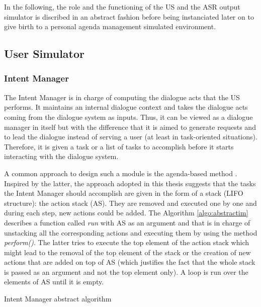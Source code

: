                                 In the following, the role and the functioning of the US and the ASR output simulator is discribed in an abstract fashion before being instanciated later on to give birth to a personal agenda management simulated environment.
    
	\subsection{User Simulator}

			\subsubsection{Intent Manager}
			\label{subsec:intentmanager}

					The Intent Manager is in charge of computing the dialogue acts that the US performs. It maintains an internal dialogue context and takes the dialogue acts coming from the dialogue system as inputs. Thus, it can be viewed as a dialogue manager in itself but with the difference that it is aimed to generate requests and to lead the dialogue instead of serving a user (at least in task-oriented situations). Therefore, it is given a task or a list of tasks to accomplish before it starts interacting with the dialogue system.

					A common approach to design such a module is the agenda-based method \cite{Wei1999,Schatzmann2007}. Inspired by the latter, the approach adopted in this thesis suggests that the tasks the Intent Manager should accomplish are given in the form of a stack (LIFO structure): the action stack (AS). They are removed and executed one by one and during each step, new actions could be added. The Algorithm \ref{algo:abstractim} describes a function called \textit{run} with AS as an argument and that is in charge of unstacking all the corresponding actions and executing them by using the method \textit{perform()}. The latter tries to execute the top element of the action stack which might lead to the removal of the top element of the stack or the creation of new actions that are added on top of AS (which justifies the fact that the whole stack is passed as an argument and not the top element only). A loop is run over the elements of AS until it is empty.

					\begin{algorithm}[htp]
						\DontPrintSemicolon
						\caption{Intent Manager abstract algorithm}
						\label{algo:abstractim}
					\end{algorithm}

